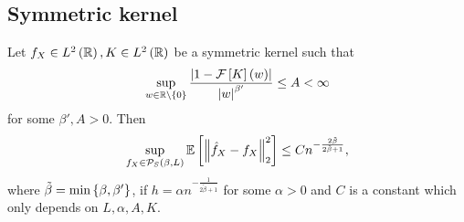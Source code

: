 \subsection{Symmetric kernel}
\begin{theorem}\label{thm:sym_ker}
	Let $f_X\in L^2\left(\mathbb{R}\right), K\in L^2\left(\mathbb{R}\right)$ be a symmetric kernel such that
	\begin{equation*}\label{eq:tocheck}
		\sup_{w\in \mathbb{R}\setminus \left\{0\right\}} \frac{\left| 1- \mathcal{F} \left[K\right] \left(w\right)\right|}{\left| w\right|^{\beta'}}\leq A <\infty
	\end{equation*}
	for some $\beta',A>0$. Then
	\begin{equation*}
		\sup_{f_X\in \mathcal{P}_S \left(\beta, L\right)} \mathbb{E}\left[\left\| \hat{f}_X - f_X \right\|^2_2\right]\leq C n^{-\frac{2\tilde{\beta}}{2\tilde{\beta}+1}},
	\end{equation*}
	where $\tilde{\beta}=\min \left\{\beta,\beta'\right\}$, if $h= \alpha n^{-\frac{1}{2\tilde{\beta} +1}}$ for some $\alpha >0$ and $C$ is a constant which only depends on $L,\alpha,A,K$.
\end{theorem}

